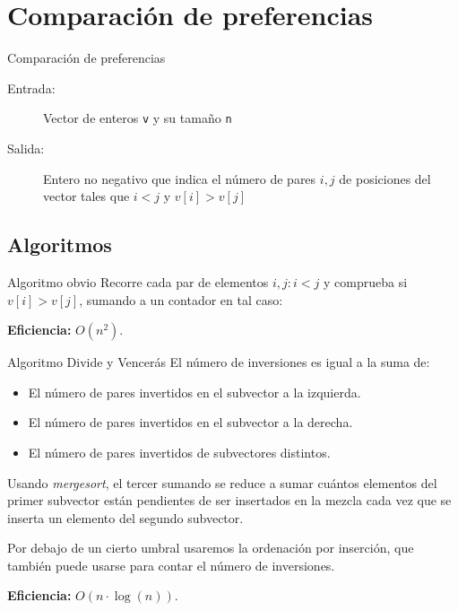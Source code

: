 \section{Comparación de preferencias}

\begin{frame}{Comparación de preferencias}
	\begin{description}
		\item[Entrada:] Vector de enteros \texttt{v} y su tamaño \texttt{n}
		\item[Salida:] Entero no negativo que indica el número de pares $i,j$ de posiciones del vector tales que $i < j$ y $v[i] > v[j]$
	\end{description}
\end{frame}

\subsection{Algoritmos}

\begin{frame}[fragile]{Algoritmo obvio}
	Recorre cada par de elementos $i,j : i < j$ y comprueba si $v[i] > v[j]$, sumando a un contador en tal caso:
	
	\textbf{Eficiencia:} $O(n^2)$.
\end{frame}

\begin{frame}[fragile]{Algoritmo Divide y Vencerás}
	El número de inversiones es igual a la suma de:
	\begin{itemize}
		\item El número de pares invertidos en el subvector a la izquierda.
		\item El número de pares invertidos en el subvector a la derecha.
		\item El número de pares invertidos de subvectores distintos.
	\end{itemize}
	
	\pause
	Usando \textit{mergesort}, el tercer sumando se reduce a sumar cuántos elementos del primer subvector están pendientes de ser insertados en la mezcla cada vez que se inserta un elemento del segundo subvector.
	
	\pause
	
	Por debajo de un cierto umbral usaremos la ordenación por inserción, que también puede usarse para contar el número de inversiones.
	
	\textbf{Eficiencia:} $O(n \cdot \log(n))$.
\end{frame}

